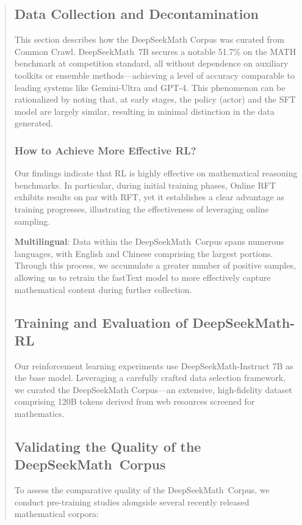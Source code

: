 \begin{abstract}
\subsection{Data Collection and Decontamination} This section describes how the DeepSeekMath Corpus was curated from Common Crawl. DeepSeekMath~7B secures a notable 51.7\% on the MATH benchmark at competition standard, all without dependence on auxiliary toolkits or ensemble methods—achieving a level of accuracy comparable to leading systems like Gemini-Ultra and GPT-4. This phenomenon can be rationalized by noting that, at early stages, the policy (actor) and the SFT model are largely similar, resulting in minimal distinction in the data generated. \subsubsection{How to Achieve More Effective RL?}
\label{sec:effec_rl}
Our findings indicate that RL is highly effective on mathematical reasoning benchmarks. In particular, during initial training phases, Online RFT exhibits results on par with RFT, yet it establishes a clear advantage as training progresses, illustrating the effectiveness of leveraging online sampling. \item \textbf{Multilingual}:
    Data within the DeepSeekMath~Corpus spans numerous languages, with English and Chinese comprising the largest portions. Through this process, we accumulate a greater number of positive samples, allowing us to retrain the fastText model to more effectively capture mathematical content during further collection. \subsection{Training and Evaluation of DeepSeekMath-RL}

Our reinforcement learning experiments use DeepSeekMath-Instruct 7B as the base model. Leveraging a carefully crafted data selection framework, we curated the DeepSeekMath Corpus—an extensive, high-fidelity dataset comprising 120B tokens derived from web resources screened for mathematics. \subsection{Validating the Quality of the DeepSeekMath~Corpus}

To assess the comparative quality of the DeepSeekMath~Corpus, we conduct pre-training studies alongside several recently released mathematical corpora:


\end{abstract}
